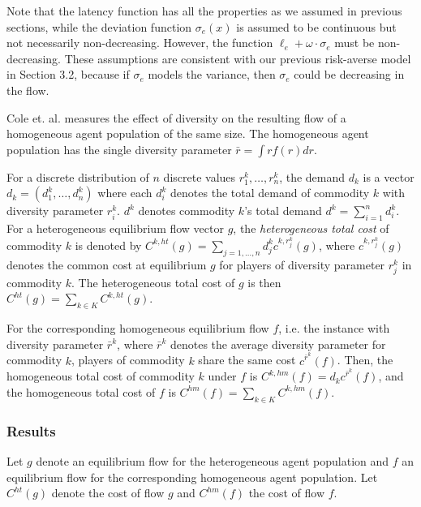 Note that the latency function has all the properties as we assumed in previous sections, while the deviation function $\sigma_e(x)$ is assumed to be continuous but not necessarily non-decreasing. However, the function $\ell_e+\omega\cdot \sigma_e$ must be non-decreasing. These assumptions are consistent with our previous risk-averse model in Section 3.2, because if $\sigma_e$ models the variance, then $\sigma_e$ could be decreasing in the flow.

Cole et. al. measures the effect of diversity on the resulting flow of a homogeneous agent population of the same size. The homogeneous agent population has the single diversity parameter $\bar{r}=\int rf(r)d r$. 

For a discrete distribution of $n$ discrete values $r_1^k, \dots, r_n^k$, the demand $d_k$ is a vector $d_k=(d_1^k, \dots, d_n^k)$ where each $d_i^k$ denotes the total demand of commodity $k$ with diversity parameter $r_i^k$. $d^k$ denotes commodity $k$'s total demand $d^k=\sum_{i=1}^n d_i^k$. For a heterogeneous equilibrium flow vector $g$, the {\it heterogeneous total cost} of commodity $k$ is denoted by $C^{k,ht}(g)=\sum_{j=1,\dots, n} d_j^k c^{k, r_j^k}(g)$, where $c^{k, r_j^k}(g)$ denotes the common cost at equilibrium $g$ for players of diversity parameter $r_j^k$ in commodity $k$. The heterogeneous total cost of $g$ is then $C^{ht}(g)=\sum_{k\in K} C^{k,ht}(g)$. 

For the corresponding homogeneous equilibrium flow $f$, i.e. the instance with diversity parameter $\bar{r}^k$, where $\bar{r}^k$ denotes the average diversity parameter for commodity $k$, players of commodity $k$ share the same cost $c^{\bar{r}^k}(f)$. Then, the homogeneous total cost of commodity $k$ under $f$ is $C^{k,hm}(f)=d_kc^{\bar{r}^k}(f)$, and the homogeneous total cost of $f$ is $C^{hm}(f)=\sum_{k\in K} C^{k,hm}(f)$. 


\subsubsection{Results}
Let $g$ denote an equilibrium flow for the heterogeneous agent population and $f$ an equilibrium flow for the corresponding homogeneous agent population. Let $C^{ht}(g)$ denote the cost of flow $g$ and $C^{hm}(f)$ the cost of flow $f$. 

